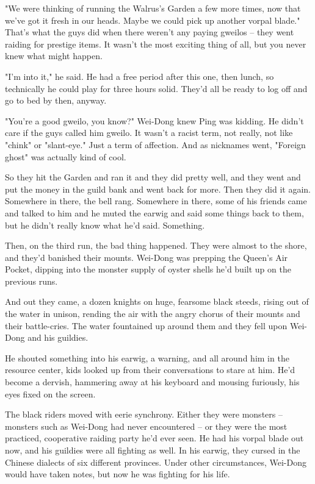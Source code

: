 "We were thinking of running the Walrus's Garden a few more times,
now that we've got it fresh in our heads. Maybe we could pick up
another vorpal blade." That's what the guys did when there weren't
any paying gweilos -- they went raiding for prestige items. It
wasn't the most exciting thing of all, but you never knew what
might happen.

"I'm into it," he said. He had a free period after this one, then
lunch, so technically he could play for three hours solid. They'd
all be ready to log off and go to bed by then, anyway.

"You're a good gweilo, you know?" Wei-Dong knew Ping was kidding.
He didn't care if the guys called him gweilo. It wasn't a racist
term, not really, not like "chink" or "slant-eye." Just a term of
affection. And as nicknames went, "Foreign ghost" was actually kind
of cool.

So they hit the Garden and ran it and they did pretty well, and
they went and put the money in the guild bank and went back for
more. Then they did it again. Somewhere in there, the bell rang.
Somewhere in there, some of his friends came and talked to him and
he muted the earwig and said some things back to them, but he
didn't really know what he'd said. Something.

Then, on the third run, the bad thing happened. They were almost to
the shore, and they'd banished their mounts. Wei-Dong was prepping
the Queen's Air Pocket, dipping into the monster supply of oyster
shells he'd built up on the previous runs.

And out they came, a dozen knights on huge, fearsome black steeds,
rising out of the water in unison, rending the air with the angry
chorus of their mounts and their battle-cries. The water fountained
up around them and they fell upon Wei-Dong and his guildies.

He shouted something into his earwig, a warning, and all around him
in the resource center, kids looked up from their conversations to
stare at him. He'd become a dervish, hammering away at his keyboard
and mousing furiously, his eyes fixed on the screen.

The black riders moved with eerie synchrony. Either they were
monsters -- monsters such as Wei-Dong had never encountered -- or
they were the most practiced, cooperative raiding party he'd ever
seen. He had his vorpal blade out now, and his guildies were all
fighting as well. In his earwig, they cursed in the Chinese
dialects of six different provinces. Under other circumstances,
Wei-Dong would have taken notes, but now he was fighting for his
life.

